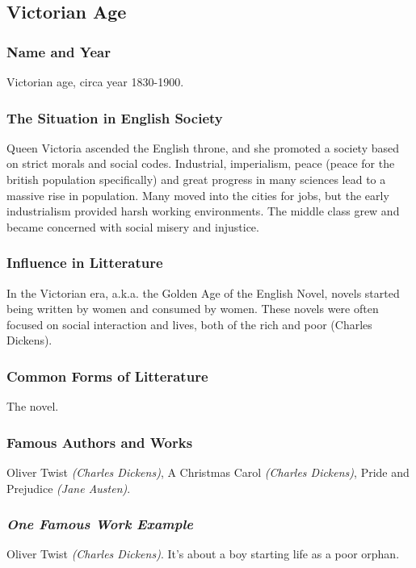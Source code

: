 \newpage
\subsection{Victorian Age}

\subsubsection{Name and Year}
Victorian age, circa year 1830-1900.

\subsubsection{The Situation in English Society}
Queen Victoria ascended the English throne, and she promoted a society based on strict morals and social codes. Industrial, imperialism, peace (peace for the british population specifically) and great progress in many sciences lead to a massive rise in population. Many moved into the cities for jobs, but the early industrialism provided harsh working environments. The middle class grew and became concerned with social misery and injustice.

\subsubsection{Influence in Litterature}
In the Victorian era, a.k.a. the Golden Age of the English Novel, novels started being written by women and consumed by women. These novels were often focused on social interaction and lives, both of the rich and poor (Charles Dickens).

\subsubsection{Common Forms of Litterature}
The novel.

\subsubsection{Famous Authors and Works}
Oliver Twist \textit{(Charles Dickens)}, A Christmas Carol \textit{(Charles Dickens)}, Pride and Prejudice \textit{(Jane Austen)}.

\subsubsection{\textit{One Famous Work Example}}
Oliver Twist \textit{(Charles Dickens)}. It's about a boy starting life as a poor orphan.

